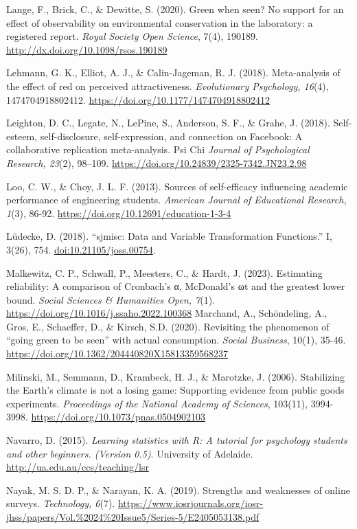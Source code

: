 \documentclass[
]{article}
\begin{document}
Lange, F., Brick, C., \& Dewitte, S. (2020). Green when seen? No support
for an effect of observability on environmental conservation in the
laboratory: a registered report. \emph{Royal Society Open Science},
7(4), 190189. \url{http://dx.doi.org/10.1098/rsos.190189}

Lehmann, G. K., Elliot, A. J., \& Calin-Jageman, R. J. (2018).
Meta-analysis of the effect of red on perceived attractiveness.
\emph{Evolutionary Psychology, 16}(4), 1474704918802412.
\url{https://doi.org/10.1177/1474704918802412}

Leighton, D. C., Legate, N., LePine, S., Anderson, S. F., \& Grahe, J.
(2018). Self-esteem, self-disclosure, self-expression, and connection on
Facebook: A collaborative replication meta-analysis. Psi Chi
\emph{Journal of Psychological Research, 23}(2), 98--109.
\url{https://doi.org/10.24839/2325-7342.JN23.2.98}

Loo, C. W., \& Choy, J. L. F. (2013). Sources of self-efficacy
influencing academic performance of engineering students. \emph{American
Journal of Educational Research, 1}(3), 86-92.
\url{https://doi.org/10.12691/education-1-3-4}

Lüdecke, D. (2018). ``sjmisc: Data and Variable Transformation
Functions.'' I, 3(26), 754. \url{doi:10.21105/joss.00754}.

Malkewitz, C. P., Schwall, P., Meesters, C., \& Hardt, J. (2023).
Estimating reliability: A comparison of Cronbach's α, McDonald's ωt and
the greatest lower bound. \emph{Social Sciences \& Humanities Open,
7}(1). \url{https://doi.org/10.1016/j.ssaho.2022.100368} Marchand, A.,
Schöndeling, A., Gros, E., Schaeffer, D., \& Kirsch, S.D. (2020).
Revisiting the phenomenon of ``going green to be seen'' with actual
consumption. \emph{Social Business}, 10(1), 35-46.
\url{https://doi.org/10.1362/204440820X15813359568237}

Milinski, M., Semmann, D., Krambeck, H. J., \& Marotzke, J. (2006).
Stabilizing the Earth's climate is not a losing game: Supporting
evidence from public goods experiments. \emph{Proceedings of the
National Academy of Sciences}, 103(11), 3994-3998.
\url{https://doi.org/10.1073/pnas.0504902103}

Navarro, D. (2015). \emph{Learning statistics with R: A tutorial for
psychology students and other beginners. (Version 0.5)}. University of
Adelaide. \url{http://ua.edu.au/ccs/teaching/lsr}

Nayak, M. S. D. P., \& Narayan, K. A. (2019). Strengths and weaknesses
of online surveys. \emph{Technology, 6}(7).
\url{https://www.iosrjournals.org/iosr-jhss/papers/Vol.\%2024\%20Issue5/Series-5/E2405053138.pdf}
\end{document}
